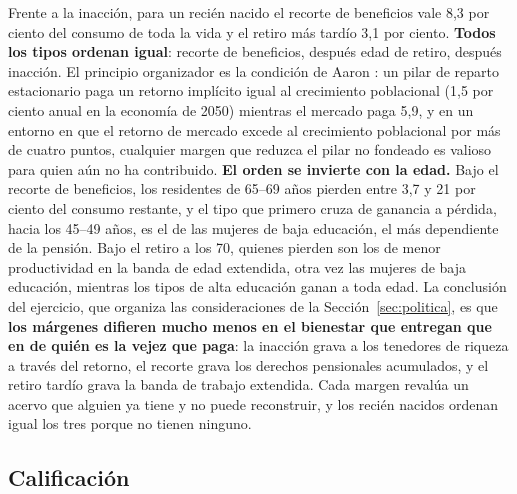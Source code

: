 \documentclass[12pt, letterpaper]{article}
\begin{document}
Frente a la inacción, para un recién nacido el recorte de beneficios vale 8,3 por
ciento del consumo de toda la vida y el retiro más tardío 3,1 por ciento. \textbf{Todos
los tipos ordenan igual}: recorte de beneficios, después edad de retiro, después
inacción. El principio organizador es la condición de Aaron \citep{aaron1966}: un
pilar de reparto estacionario paga un retorno implícito igual al crecimiento
poblacional (1,5 por ciento anual en la economía de 2050) mientras el mercado
paga 5,9, y en un entorno en que el retorno de mercado excede al crecimiento
poblacional por más de cuatro puntos, cualquier margen que reduzca el pilar no
fondeado es valioso para quien aún no ha contribuido. \textbf{El orden se invierte
con la edad.} Bajo el recorte de beneficios, los residentes de 65--69 años pierden
entre 3,7 y 21 por ciento del consumo restante, y el tipo que primero cruza de
ganancia a pérdida, hacia los 45--49 años, es el de las mujeres de baja
educación, el más dependiente de la pensión. Bajo el retiro a los 70, quienes
pierden son los de menor productividad en la banda de edad extendida, otra vez las
mujeres de baja educación, mientras los tipos de alta educación ganan a toda edad.
La conclusión del ejercicio, que organiza las consideraciones de la
Sección~\ref{sec:politica}, es que \textbf{los márgenes difieren mucho menos en el
bienestar que entregan que en de quién es la vejez que paga}: la inacción grava a
los tenedores de riqueza a través del retorno, el recorte grava los derechos
pensionales acumulados, y el retiro tardío grava la banda de trabajo extendida.
Cada margen revalúa un acervo que alguien ya tiene y no puede reconstruir, y los
recién nacidos ordenan igual los tres porque no tienen ninguno.

\subsection{Calificación}
\end{document}
